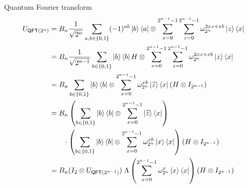 \documentclass{beamer}
\begin{document}
\begin{frame}{Quantum Fourier transform}
\small
\vspace{-1em}
\begin{align*}
U_{\mathsf{QFT}(2^n)} &= B_n\frac1{\sqrt{2^{n}}}\sum_{a,b\in\{0,1\}}(-1)^{ab}\ket{b}\bra{a}\otimes \sum_{x=0}^{2^{n-1}-1}\sum_{z=0}^{2^{n-1}-1}\omega_{2^n}^{2xz + xb}\ket{z}\bra{x}\\
&= B_n\frac1{\sqrt{2^{n-1}}}\sum_{b\in\{0,1\}}\ket{b}\bra{b}H\otimes \sum_{x=0}^{2^{n-1}-1}\sum_{z=0}^{2^{n-1}-1}\omega_{2^n}^{2xz + xb}\ket{z}\bra{x}\\
&= B_n\sum_{b\in\{0,1\}}\ket{b}\bra{b}\otimes \sum_{x=0}^{2^{n-1}-1}\omega_{2^n}^{xb}\ket{\widehat{z}}\bra{x}  (H\otimes I_{2^{n-1}})\\
&= B_n\left(\sum_{b\in\{0,1\}}\ket{b}\bra{b}\otimes \sum_{x=0}^{2^{n-1}-1}\ket{\widehat{z}}\bra{x}\right)\\
&\qquad\cdot\left(\sum_{b\in\{0,1\}}\ket{b}\bra{b}\otimes \sum_{x=0}^{2^{n-1}-1}\omega_{2^n}^{xb}\ket{x}\bra{x}\right)  (H\otimes I_{2^{n-1}})\\
&= B_n (I_2\otimes U_{\mathsf{QFT}(2^{n-1})}) \; \Lambda\left(\sum_{x=0}^{2^{n-1}-1}\omega_{2^n}^{x}\ket{x}\bra{x}\right) (H\otimes I_{2^{n-1}})
\end{align*}
\end{frame}
\end{document}
